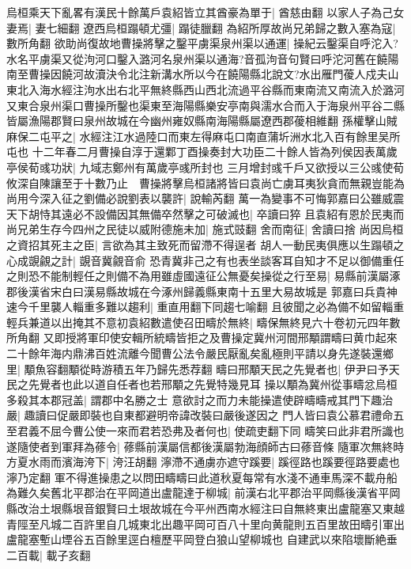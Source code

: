 烏桓乘天下亂畧有漢民十餘萬戶袁紹皆立其酋豪為單于|{
	酋慈由翻}
以家人子為己女妻焉|{
	妻七細翻}
遼西烏桓蹋頓尤彊|{
	蹋徒臘翻}
為紹所厚故尚兄弟歸之數入塞為寇|{
	數所角翻}
欲助尚復故地曹操將擊之鑿平虜渠泉州渠以通運|{
	操紀云鑿渠自呼沱入?水名平虜渠又從泃河口鑿入潞河名泉州渠以通海?音孤泃音句賢曰呼沱河舊在饒陽南至曹操因饒河故瀆決令北注新溝水所以今在饒陽縣北說文?水出雁門葰人戍夫山東北入海水經注泃水出右北平無終縣西山西北流過平谷縣而東南流又南流入於潞河又東合泉州渠口曹操所鑿也渠東至海陽縣樂安亭南與濡水合而入于海泉州平谷二縣皆屬漁陽郡賢曰泉州故城在今幽州雍奴縣南海陽縣屬遼西郡葰相維翻}
孫權擊山賊麻保二屯平之|{
	水經注江水過陸口而東左得麻屯口南直蒲圻洲水北入百有餘里吴所屯也}
十二年春二月曹操自淳于還鄴丁酉操奏封大功臣二十餘人皆為列侯因表萬歲亭侯荀彧功狀|{
	九域志鄭州有萬歲亭彧所封也}
三月增封彧千戶又欲授以三公彧使荀攸深自陳讓至于十數乃止　曹操將擊烏桓諸將皆曰袁尚亡虜耳夷狄貪而無親豈能為尚用今深入征之劉備必說劉表以襲許|{
	說輸芮翻}
萬一為變事不可悔郭嘉曰公雖威震天下胡恃其遠必不設備因其無備卒然擊之可破滅也|{
	卒讀曰猝}
且袁紹有恩於民夷而尚兄弟生存今四州之民徒以威附德施未加|{
	施式豉翻}
舍而南征|{
	舍讀曰捨}
尚因烏桓之資招其死主之臣|{
	言欲為其主致死而留滯不得逞者}
胡人一動民夷俱應以生蹋頓之心成覬覦之計|{
	覬音冀覦音俞}
恐青冀非己之有也表坐談客耳自知才不足以御備重任之則恐不能制輕任之則備不為用雖虛國遠征公無憂矣操從之行至易|{
	易縣前漢屬涿郡後漢省宋白曰漢易縣故城在今涿州歸義縣東南十五里大易故城是}
郭嘉曰兵貴神速今千里襲人輜重多難以趨利|{
	重直用翻下同趨七喻翻}
且彼聞之必為備不如留輜重輕兵兼道以出掩其不意初袁紹數遣使召田疇於無終|{
	疇保無終見六十卷初元四年數所角翻}
又即授將軍印使安輯所統疇皆拒之及曹操定冀州河間邢顒謂疇曰黄巾起來二十餘年海内鼎沸百姓流離今聞曹公法令嚴民厭亂矣亂極則平請以身先遂裝還鄉里|{
	顒魚容翻顒從畤游積五年乃歸先悉荐翻}
疇曰邢顒天民之先覺者也|{
	伊尹曰予天民之先覺者也此以道自任者也若邢顒之先覺特幾見耳}
操以顒為冀州從事疇忿烏桓多殺其本郡冠盖|{
	謂郡中名勝之士}
意欲討之而力未能操遣使辟疇疇戒其門下趣治嚴|{
	趣讀曰促嚴即裝也自東都避明帝諱改裝曰嚴後遂因之}
門人皆曰袁公慕君禮命五至君義不屈今曹公使一來而君若恐弗及者何也|{
	使疏吏翻下同}
疇笑曰此非君所識也遂隨使者到軍拜為蓚令|{
	蓚縣前漢屬信都後漢屬勃海顔師古曰蓚音條}
隨軍次無終時方夏水雨而濱海洿下|{
	洿汪胡翻}
濘滯不通虜亦遮守蹊要|{
	蹊徑路也蹊要徑路要處也濘乃定翻}
軍不得進操患之以問田疇疇曰此道秋夏每常有水淺不通車馬深不載舟船為難久矣舊北平郡治在平岡道出盧龍達于柳城|{
	前漢右北平郡治平岡縣後漢省平岡縣改治土垠縣垠音銀賢曰土垠故城在今平州西南水經注曰自無終東出盧龍塞又東越青陘至凡城二百許里自几城東北出趣平岡可百八十里向黄龍則五百里故田疇引軍出盧龍塞塹山堙谷五百餘里逕白檀歷平岡登白狼山望柳城也}
自建武以來陷壞斷絶垂二百載|{
	載子亥翻}

